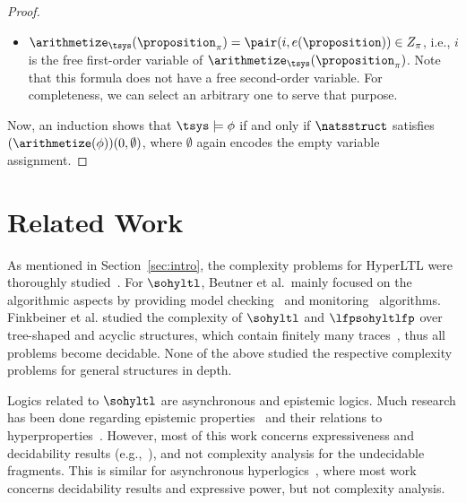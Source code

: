 \begin{proof}
\begin{itemize}
    \item $\arithmetize_\tsys(\proposition_\pi) = \pair(i,e(\proposition)) \in Z_\pi$, i.e., $i$ is the free first-order variable of $\arithmetize_\tsys(\proposition_\pi)$. Note that this formula does not have a free second-order variable. For completeness, we can select an arbitrary one to serve that purpose.
    
\end{itemize}
Now, an induction shows that $\tsys\models \phi$ if and only if $\natsstruct$ satisfies $(\arithmetize(\phi))(0,\emptyset)$, where $\emptyset$ again encodes the empty variable assignment.
\end{proof}





\section{Related Work}
\label{sec_relatedwork}
As mentioned in Section~\ref{sec:intro}, the complexity problems for HyperLTL were thoroughly studied~\cite{FinkbeinerH16,hyperltlsatconf,hyperltlsat}. For $\sohyltl$, Beutner et al.\ mainly focused on the algorithmic aspects by providing model checking~\cite{DBLP:conf/cav/BeutnerFFM23} and monitoring~\cite{BeutnerFFM24} algorithms.
Finkbeiner et al. studied the complexity of $\sohyltl$ and $\lfpsohyltlfp$ over tree-shaped and acyclic structures, which contain finitely many traces~\cite{FoSSaCS26}, thus all problems become decidable.
None of the above studied the respective complexity problems for general structures in depth. 

Logics related to $\sohyltl$ are asynchronous and epistemic logics. Much research has been done regarding epistemic properties~\cite{DBLP:conf/clima/Dima08,DBLP:books/mit/FHMV1995,DBLP:conf/atal/LomuscioR06a,DBLP:conf/fsttcs/MeydenS99} and their relations to hyperproperties~\cite{DBLP:conf/fossacs/BozzelliMP15}. However, most of this work concerns expressiveness and decidability results (e.g.,~\cite{DBLP:journals/tocl/BozzelliMM24}), and not complexity analysis for the undecidable fragments. This is similar for asynchronous hyperlogics~\cite{BartocciHNC23,DBLP:conf/cav/BaumeisterCBFS21,BeutnerF23,DBLP:journals/corr/abs-2404-16778,DBLP:conf/lics/BozzelliPS21,DBLP:conf/concur/BozzelliPS22,DBLP:journals/pacmpl/GutsfeldMO21,DBLP:conf/mfcs/KontinenSV23,KontinenSV24,DBLP:conf/mfcs/KrebsMV018}, where most work concerns decidability results and expressive power, but not complexity analysis. 

